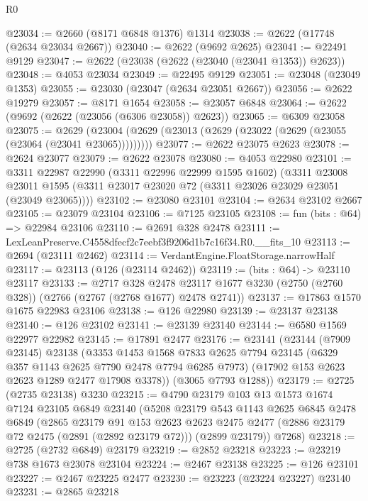 \begin{lexlean}{R0}
\begin{coremodule}
@23034 := @2660 (@8171 @6848 @1376) @1314
@23038 := @2622 (@17748 (@2634 @23034 @2667))
@23040 := @2622 (@9692 @2625)
@23041 := @22491 @9129
@23047 := @2622 (@23038 (@2622 (@23040 (@23041 @1353)) @2623))
@23048 := @4053 @23034
@23049 := @22495 @9129
@23051 := @23048 (@23049 @1353)
@23055 := @23030 (@23047 (@2634 @23051 @2667))
@23056 := @2622 @19279
@23057 := @8171 @1654
@23058 := @23057 @6848
@23064 := @2622 (@9692 (@2622 (@23056 (@6306 @23058)) @2623))
@23065 := @6309 @23058
@23075 := @2629 (@23004 (@2629 (@23013 (@2629 (@23022 (@2629 (@23055 (@23064 (@23041 @23065)))))))))
@23077 := @2622 @23075 @2623
@23078 := @2624 @23077
@23079 := @2622 @23078
@23080 := @4053 @22980
@23101 := @3311
    @22987
    @22990
    (@3311 @22996 @22999 @1595 @1602)
    (@3311
      @23008
      @23011
      @1595
      (@3311 @23017 @23020 @72 (@3311 @23026 @23029 @23051 (@23049 @23065))))
@23102 := @23080 @23101
@23104 := @2634 @23102 @2667
@23105 := @23079 @23104
@23106 := @7125 @23105
@23108 := fun (bits : @64) => @22984 @23106
@23110 := @2691 @328 @2478
@23111 := LexLeanPreserve.C4558dfecf2c7eebf3f9206d1b7c16f34.R0.__fits_10
@23113 := @2694 (@23111 @2462)
@23114 := VerdantEngine.FloatStorage.narrowHalf
@23117 := @23113 (@126 (@23114 @2462))
@23119 := (bits : @64) -> @23110 @23117
@23133 := @2717
    @328
    @2478
    @23117
    @1677
    @3230
    (@2750 (@2760 @328))
    (@2766 (@2767 (@2768 @1677) @2478 @2741))
@23137 := @17863 @1570 @1675 @22983 @23106
@23138 := @126 @22980
@23139 := @23137 @23138
@23140 := @126 @23102
@23141 := @23139 @23140
@23144 := @6580 @1569 @22977 @22982
@23145 := @17891 @2477
@23176 := @23141
    (@23144
      (@7909 @23145)
      @23138
      (@3353
        @1453
        @1568
        @7833
        @2625
        @7794
        @23145
        (@6329 @357 @1143 @2625 @7790 @2478 @7794 @6285 @7973)
        (@17902 @153 @2623 @2623 @1289 @2477 @17908 @3378))
      (@3065 @7793 @1288))
@23179 := @2725 (@2735 @23138) @3230
@23215 := @4790
    @23179
    @103
    @13
    @1573
    @1674
    @7124
    @23105
    @6849
    @23140
    (@5208
      @23179
      @543
      @1143
      @2625
      @6845
      @2478
      @6849
      (@2865
        @23179
        @91
        @153
        @2623
        @2623
        @2475
        @2477
        (@2886 @23179 @72 @2475 (@2891 (@2892 @23179 @72)))
        (@2899 @23179))
      @7268)
@23218 := @2725 (@2732 @6849) @23179
@23219 := @2852 @23218
@23223 := @23219 @738 @1673 @23078 @23104
@23224 := @2467 @23138
@23225 := @126 @23101
@23227 := @2467 @23225 @2477
@23230 := @23223 (@23224 @23227) @23140
@23231 := @2865 @23218

\end{coremodule}
\end{lexlean}
